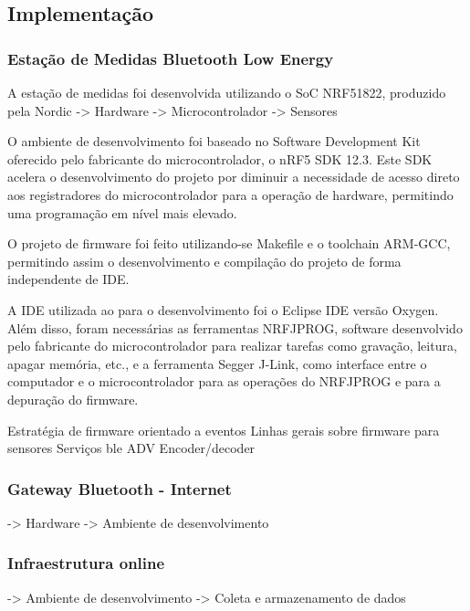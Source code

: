 
\subsection{Implementação}

\subsubsection{Estação de Medidas Bluetooth Low Energy}

A estação de medidas foi desenvolvida utilizando o SoC NRF51822, produzido pela Nordic
-> Hardware
-> Microcontrolador
-> Sensores		

O ambiente de desenvolvimento foi baseado no Software Development Kit oferecido
pelo fabricante do microcontrolador, o nRF5 SDK 12.3. Este SDK acelera o
desenvolvimento do projeto por diminuir a necessidade de acesso direto aos
registradores do microcontrolador para a operação de hardware, permitindo uma
programação em nível mais elevado.
 
O projeto de firmware foi feito utilizando-se Makefile e o toolchain ARM-GCC,
permitindo assim o desenvolvimento e compilação do projeto de forma
independente de IDE.

A IDE utilizada ao para o desenvolvimento foi o Eclipse IDE versão Oxygen. Além
disso, foram necessárias as ferramentas NRFJPROG, software desenvolvido pelo
fabricante do microcontrolador para realizar tarefas como gravação, leitura,
apagar memória, etc., e a ferramenta Segger J-Link, como interface entre o
computador e o microcontrolador para as operações do NRFJPROG e para a
depuração do firmware.
 

Estratégia de firmware orientado a eventos
Linhas gerais sobre firmware para sensores
Serviços ble
ADV Encoder/decoder


\subsubsection{Gateway Bluetooth - Internet}
			-> Hardware
			-> Ambiente de desenvolvimento

\subsubsection{Infraestrutura online}
-> Ambiente de desenvolvimento	
-> Coleta e armazenamento de dados
